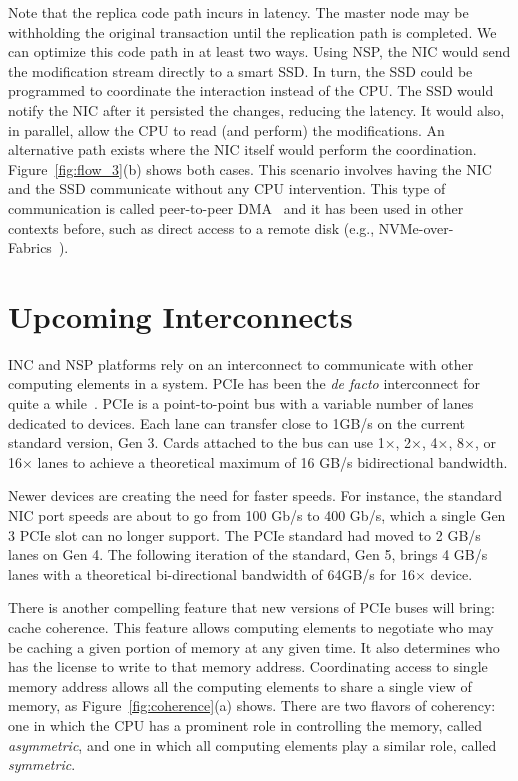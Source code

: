 \documentclass[11pt,dvipdfmx]{article}
\begin{document}
Note that the replica code path incurs in latency.
The master node may be withholding the original transaction until the
replication path is completed.
We can optimize this code path in at least two ways.
Using NSP, the NIC would send the modification stream directly to a smart SSD.
In turn, the SSD could be programmed to coordinate the interaction instead of
the CPU.
The SSD would notify the NIC after it persisted the changes, reducing the
latency.
It would also, in parallel, allow the CPU to read (and perform) the
modifications.
An alternative path exists where the NIC itself would perform the coordination.
Figure~\ref{fig:flow_3}(b) shows both cases.
This scenario involves having the NIC and the SSD communicate without any CPU
intervention.
This type of communication is called peer-to-peer DMA~\cite{budruk03} and it has
been used in other contexts before, such as direct access to a remote disk
(e.g., NVMe-over-Fabrics~\cite{guz18}).


\section{Upcoming Interconnects}
\label{sec:interconnects}

INC and NSP platforms rely on an interconnect to communicate with other
computing elements in a system.
PCIe has been the \emph{de facto} interconnect for quite a
while~\cite{budruk03}.
PCIe is a point-to-point bus with a variable number of lanes dedicated to
devices.
Each lane can transfer close to 1GB/s on the current standard version, Gen 3.
Cards attached to the bus can use 1$\times$, 2$\times$, 4$\times$, 8$\times$, or
16$\times$ lanes to achieve a theoretical maximum of 16 GB/s bidirectional
bandwidth.


Newer devices are creating the need for faster speeds.
For instance, the standard NIC port speeds are about to go from 100 Gb/s to 400
Gb/s, which a single Gen 3 PCIe slot can no longer support.
The PCIe standard had moved to 2 GB/s lanes on Gen 4.
The following iteration of the standard, Gen 5, brings 4 GB/s lanes with a
theoretical bi-directional bandwidth of 64GB/s for 16$\times$ device.


There is another compelling feature that new versions of PCIe buses will bring:
cache coherence.
This feature allows computing elements to negotiate who may be caching a given
portion of memory at any given time.
It also determines who has the license to write to that memory address.
Coordinating access to single memory address allows all the computing elements
to share a single view of memory, as Figure~\ref{fig:coherence}(a) shows.
There are two flavors of coherency: one in which the CPU has a prominent role in
controlling the memory, called \emph{asymmetric}, and one in which all computing
elements play a similar role, called \emph{symmetric}.
\end{document}
